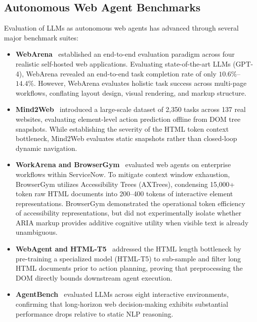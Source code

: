 \documentclass[11pt,a4paper]{article}
\begin{document}
\subsection{Autonomous Web Agent Benchmarks}
Evaluation of LLMs as autonomous web agents has advanced through several major benchmark suites:
\begin{itemize}
    \item \textbf{WebArena}~\cite{zhou2024webarena} established an end-to-end evaluation paradigm across four realistic self-hosted web applications. Evaluating state-of-the-art LLMs (GPT-4), WebArena revealed an end-to-end task completion rate of only $10.6\%$--$14.4\%$. However, WebArena evaluates holistic task success across multi-page workflows, conflating layout design, visual rendering, and markup structure.
    \item \textbf{Mind2Web}~\cite{deng2023mind2web} introduced a large-scale dataset of 2,350 tasks across 137 real websites, evaluating element-level action prediction offline from DOM tree snapshots. While establishing the severity of the HTML token context bottleneck, Mind2Web evaluates static snapshots rather than closed-loop dynamic navigation.
    \item \textbf{WorkArena and BrowserGym}~\cite{drouin2024workarena} evaluated web agents on enterprise workflows within ServiceNow. To mitigate context window exhaustion, BrowserGym utilizes Accessibility Trees (AXTrees), condensing 15,000+ token raw HTML documents into 200--400 tokens of interactive element representations. BrowserGym demonstrated the operational token efficiency of accessibility representations, but did not experimentally isolate whether ARIA markup provides additive cognitive utility when visible text is already unambiguous.
    \item \textbf{WebAgent and HTML-T5}~\cite{gur2024webagent} addressed the HTML length bottleneck by pre-training a specialized model (HTML-T5) to sub-sample and filter long HTML documents prior to action planning, proving that preprocessing the DOM directly bounds downstream agent execution.
    \item \textbf{AgentBench}~\cite{liu2024agentbench} evaluated LLMs across eight interactive environments, confirming that long-horizon web decision-making exhibits substantial performance drops relative to static NLP reasoning.
\end{itemize}
\end{document}
